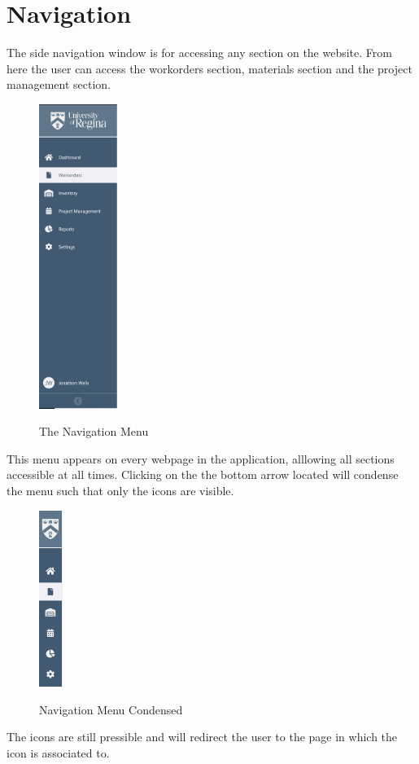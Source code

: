 \section{Navigation}
The side navigation window is for accessing any section on the website. From here the user can access the workorders section, materials section and the project management section. 
\begin{figure}[H]
	\centering
	\includegraphics[width=1in]{Navigation.png}\\
	\caption{The Navigation Menu}
	\label{fig:tobias}
\end{figure}

This menu appears on every webpage in the application, alllowing all sections accessible at all times. Clicking on the the bottom arrow located will condense the menu such that only the icons are visible. 
\begin{figure}[H]
	\centering
	\includegraphics[width=0.3in]{nav-small.png}\\
	\caption{Navigation Menu Condensed}
	\label{fig:tobias}
\end{figure}
The icons are still pressible and will redirect the user to the page in which the icon is associated to. 
\newpage
